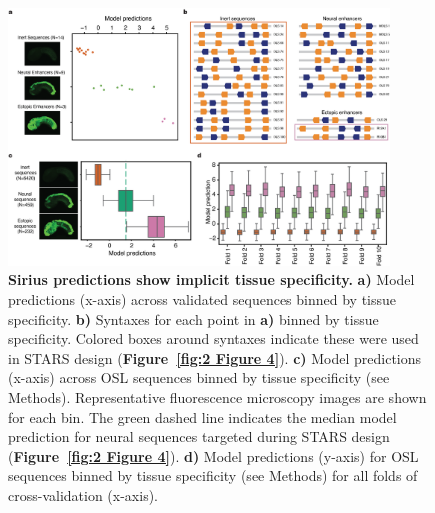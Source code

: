 \begin{figure}[p]
    \centering
    \includegraphics[width=0.9\textwidth]{2_figures-and-files/SuppFig10.png}
    \caption[Sirius predictions show implicit tissue specificity.]{\textbf{Sirius predictions show implicit tissue specificity.} \textbf{a)} Model predictions (x-axis) across validated sequences binned by tissue specificity. \textbf{b)} Syntaxes for each point in \textbf{a)} binned by tissue specificity. Colored boxes around syntaxes indicate these were used in STARS design (\textbf{Figure~\ref{fig:2 Figure 4}}). \textbf{c)} Model predictions (x-axis) across OSL sequences binned by tissue specificity (see Methods). Representative fluorescence microscopy images are shown for each bin. The green dashed line indicates the median model prediction for neural sequences targeted during STARS design (\textbf{Figure~\ref{fig:2 Figure 4}}). \textbf{d)} Model predictions (y-axis) for OSL sequences binned by tissue specificity (see Methods) for all folds of cross-validation (x-axis).}
    \label{fig:2 supplementary_10}
\end{figure}

